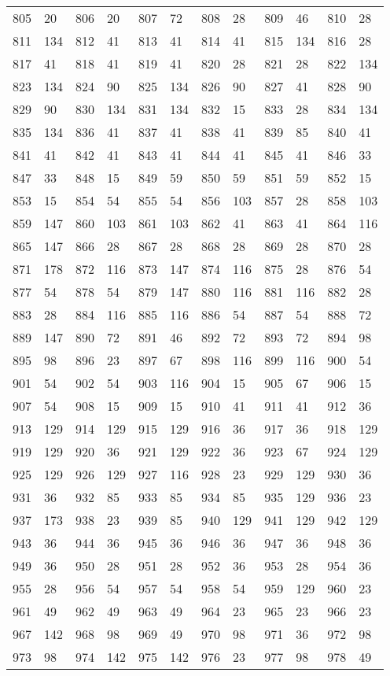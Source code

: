\begin{longtable}{llllllllllll}
805 & 20&806 &20&807& 72&808 &28&809 &46&810& 28\\
811 & 134&812 &41&813& 41&814 &41&815 &134&816& 28\\
817 & 41&818 &41&819& 41&820 &28&821 &28&822& 134\\
823 & 134&824 &90&825& 134&826 &90&827 &41&828& 90\\
829 & 90&830 &134&831& 134&832 &15&833 &28&834& 134\\
835 & 134&836 &41&837& 41&838 &41&839 &85&840& 41\\
841 & 41&842 &41&843& 41&844 &41&845 &41&846& 33\\
847 & 33&848 &15&849& 59&850 &59&851 &59&852& 15\\
853 & 15&854 &54&855& 54&856 &103&857 &28&858& 103\\
859 & 147&860 &103&861& 103&862 &41&863 &41&864& 116\\
865 & 147&866 &28&867& 28&868 &28&869 &28&870& 28\\
871 & 178&872 &116&873& 147&874 &116&875 &28&876& 54\\
877 & 54&878 &54&879& 147&880 &116&881 &116&882& 28\\
883 & 28&884 &116&885& 116&886 &54&887 &54&888& 72\\
889 & 147&890 &72&891& 46&892 &72&893 &72&894& 98\\
895 & 98&896 &23&897& 67&898 &116&899 &116&900& 54\\
901 & 54&902 &54&903& 116&904 &15&905 &67&906& 15\\
907 & 54&908 &15&909& 15&910 &41&911 &41&912& 36\\
913 & 129&914 &129&915& 129&916 &36&917 &36&918& 129\\
919 & 129&920 &36&921& 129&922 &36&923 &67&924& 129\\
925 & 129&926 &129&927& 116&928 &23&929 &129&930& 36\\
931 & 36&932 &85&933& 85&934 &85&935 &129&936& 23\\
937 & 173&938 &23&939& 85&940 &129&941 &129&942& 129\\
943 & 36&944 &36&945& 36&946 &36&947 &36&948& 36\\
949 & 36&950 &28&951& 28&952 &36&953 &28&954& 36\\
955 & 28&956 &54&957& 54&958 &54&959 &129&960& 23\\
961 & 49&962 &49&963& 49&964 &23&965 &23&966& 23\\
967 & 142&968 &98&969& 49&970 &98&971 &36&972& 98\\
973 & 98&974 &142&975& 142&976 &23&977 &98&978& 49\\

\end{longtable}
